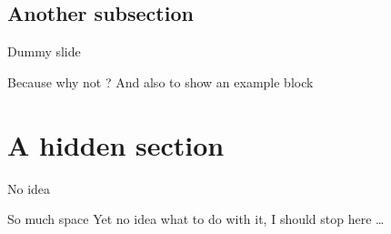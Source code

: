 \documentclass[xcolor={usenames,dvipsnames}]{beamer}
\begin{document}
\subsection{Another subsection}
\begin{frame}{Dummy slide}
    \begin{exampleblock}{Because why not ?}
        And also to show an example block
    \end{exampleblock}
\end{frame}
\section*{A hidden section}
\begin{frame}{No idea}
    \begin{block}{So much space}
        Yet no idea what to do with it, I should stop here \ldots
    \end{block}
\end{frame}
\setcounter{finalframe}{\value{framenumber}}

%
%
%


\end{document}
